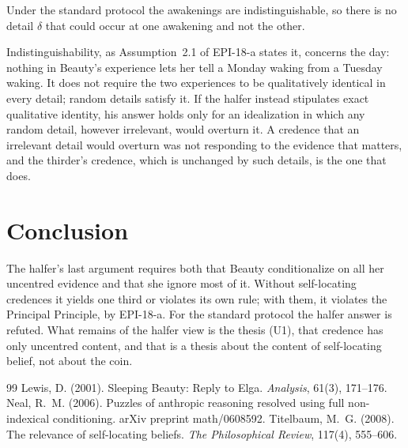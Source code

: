 \documentclass{situationist-preprint}
\begin{document}
\begin{objection}
Under the standard protocol the awakenings are indistinguishable, so there is no detail $\delta$ that could occur at one awakening and not the other.
\end{objection}

\begin{reply}
Indistinguishability, as Assumption~2.1 of EPI-18-a states it, concerns the day: nothing in Beauty's experience lets her tell a Monday waking from a Tuesday waking. It does not require the two experiences to be qualitatively identical in every detail; random details satisfy it. If the halfer instead stipulates exact qualitative identity, his answer holds only for an idealization in which any random detail, however irrelevant, would overturn it. A credence that an irrelevant detail would overturn was not responding to the evidence that matters, and the thirder's credence, which is unchanged by such details, is the one that does.
\end{reply}

\section{Conclusion}

The halfer's last argument requires both that Beauty conditionalize on all her uncentred evidence and that she ignore most of it. Without self-locating credences it yields one third or violates its own rule; with them, it violates the Principal Principle, by EPI-18-a. For the standard protocol the halfer answer is refuted. What remains of the halfer view is the thesis (U1), that credence has only uncentred content, and that is a thesis about the content of self-locating belief, not about the coin.

\begin{thebibliography}{99}\small
{} Lewis, D. (2001). Sleeping Beauty: Reply to Elga. \emph{Analysis}, 61(3), 171--176.
 Neal, R.~M. (2006). Puzzles of anthropic reasoning resolved using full non-indexical conditioning. arXiv preprint math/0608592.
 Titelbaum, M.~G. (2008). The relevance of self-locating beliefs. \emph{The Philosophical Review}, 117(4), 555--606.
\end{thebibliography}
\end{document}
